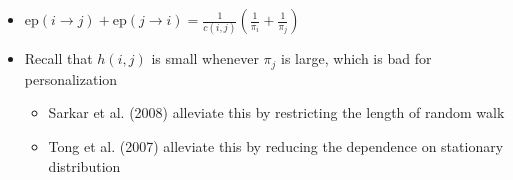 \documentclass{article}
\begin{document}
\begin{itemize}
\item $\mathrm{ep}(i\rightarrow j) + \mathrm{ep}(j\rightarrow i) = \frac{1}{c(i,j)}\left(\frac{1}{\pi_i} + \frac{1}{\pi_j}\right)$
\item Recall that $h(i,j)$ is small whenever $\pi_j$ is large, which is bad for personalization
\begin{itemize}
\item Sarkar et al. (2008) alleviate this by restricting the length of random walk
\item Tong et al. (2007) alleviate this by reducing the dependence on stationary distribution
\end{itemize}
\end{itemize}
\end{document}
